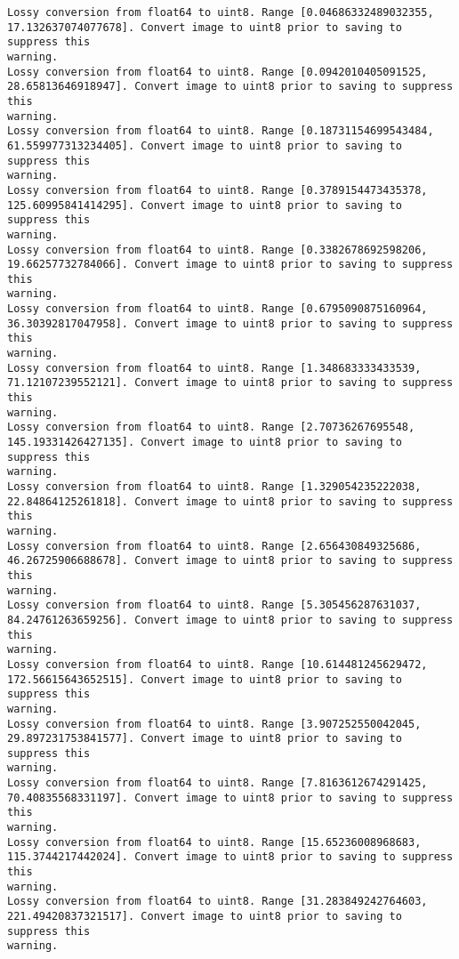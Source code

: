 \documentclass[11pt]{article}
\begin{document}
    \begin{Verbatim}[commandchars=\\\{\}]
Lossy conversion from float64 to uint8. Range [0.04686332489032355,
17.132637074077678]. Convert image to uint8 prior to saving to suppress this
warning.
Lossy conversion from float64 to uint8. Range [0.0942010405091525,
28.65813646918947]. Convert image to uint8 prior to saving to suppress this
warning.
Lossy conversion from float64 to uint8. Range [0.18731154699543484,
61.559977313234405]. Convert image to uint8 prior to saving to suppress this
warning.
Lossy conversion from float64 to uint8. Range [0.3789154473435378,
125.60995841414295]. Convert image to uint8 prior to saving to suppress this
warning.
Lossy conversion from float64 to uint8. Range [0.3382678692598206,
19.66257732784066]. Convert image to uint8 prior to saving to suppress this
warning.
Lossy conversion from float64 to uint8. Range [0.6795090875160964,
36.30392817047958]. Convert image to uint8 prior to saving to suppress this
warning.
Lossy conversion from float64 to uint8. Range [1.348683333433539,
71.12107239552121]. Convert image to uint8 prior to saving to suppress this
warning.
Lossy conversion from float64 to uint8. Range [2.70736267695548,
145.19331426427135]. Convert image to uint8 prior to saving to suppress this
warning.
Lossy conversion from float64 to uint8. Range [1.329054235222038,
22.84864125261818]. Convert image to uint8 prior to saving to suppress this
warning.
Lossy conversion from float64 to uint8. Range [2.656430849325686,
46.26725906688678]. Convert image to uint8 prior to saving to suppress this
warning.
Lossy conversion from float64 to uint8. Range [5.305456287631037,
84.24761263659256]. Convert image to uint8 prior to saving to suppress this
warning.
Lossy conversion from float64 to uint8. Range [10.614481245629472,
172.56615643652515]. Convert image to uint8 prior to saving to suppress this
warning.
Lossy conversion from float64 to uint8. Range [3.907252550042045,
29.897231753841577]. Convert image to uint8 prior to saving to suppress this
warning.
Lossy conversion from float64 to uint8. Range [7.8163612674291425,
70.40835568331197]. Convert image to uint8 prior to saving to suppress this
warning.
Lossy conversion from float64 to uint8. Range [15.65236008968683,
115.3744217442024]. Convert image to uint8 prior to saving to suppress this
warning.
Lossy conversion from float64 to uint8. Range [31.283849242764603,
221.49420837321517]. Convert image to uint8 prior to saving to suppress this
warning.
    \end{Verbatim}
\end{document}
